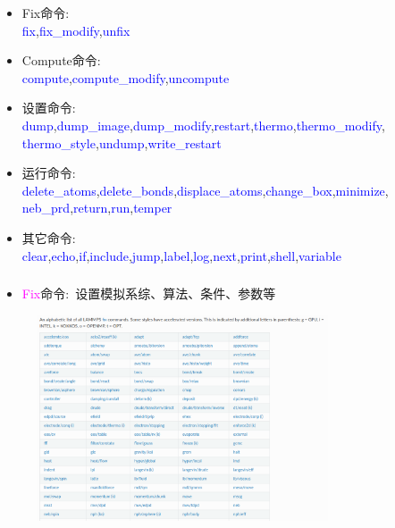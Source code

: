 {\begin{itemize}
		\item \textrm{Fix}命令:\\
			\textcolor{blue}{fix},\textcolor{blue}{fix\_modify},\textcolor{blue}{unfix}
		\item \textrm{Compute}命令:\\
			\textcolor{blue}{compute},\textcolor{blue}{compute\_modify},\textcolor{blue}{uncompute}
		\item 设置命令:\\
			\textcolor{blue}{dump},\textcolor{blue}{dump\_image},\textcolor{blue}{dump\_modify},\textcolor{blue}{restart},\textcolor{blue}{thermo},\textcolor{blue}{thermo\_modify},\\\textcolor{blue}{thermo\_style},\textcolor{blue}{undump},\textcolor{blue}{write\_restart}
		\item 运行命令:\\
			\textcolor{blue}{delete\_atoms},\textcolor{blue}{delete\_bonds},\textcolor{blue}{displace\_atoms},\textcolor{blue}{change\_box},\textcolor{blue}{minimize},\\\textcolor{blue}{neb\_prd},\textcolor{blue}{return},\textcolor{blue}{run},\textcolor{blue}{temper}
		\item 其它命令:\\
			\textcolor{blue}{clear},\textcolor{blue}{echo},\textcolor{blue}{if},\textcolor{blue}{include},\textcolor{blue}{jump},\textcolor{blue}{label},\textcolor{blue}{log},\textcolor{blue}{next},\textcolor{blue}{print},\textcolor{blue}{shell},\textcolor{blue}{variable}
	\end{itemize}
}

\frame
{
	\frametitle{}
	\begin{itemize}
		\item \textcolor{magenta}{Fix}命令:~设置模拟系综、算法、条件、参数等
	\end{itemize}
\begin{figure}[h!]
\centering
\vspace*{-0.1in}
\includegraphics[height=2.4in,width=3.4in,viewport=0 0 1100 760,clip]{Figures/LAMMPS-fix_command.png}
\label{LAMMPS-Fix}
\end{figure}
}


